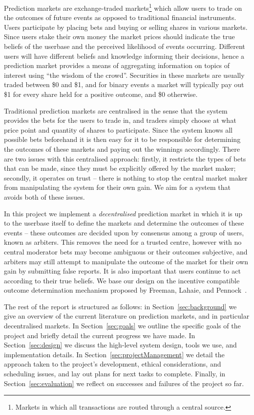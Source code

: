 \documentclass[10pt,a4paper]{article}
\theoremstyle{plain}
\theoremstyle{definition}
\begin{document}
Prediction markets are exchange-traded markets\footnote{Markets in which all
transactions are routed through a central source.} which allow users to trade
on the outcomes of future events as opposed to traditional financial
instruments. Users participate by placing bets and buying or selling shares in
various markets. Since users stake their own money the market prices should
indicate the true beliefs of the userbase and the perceived likelihood of
events occurring. Different users will have different beliefs and knowledge
informing their decisions, hence a prediction market provides a means of
aggregating information on topics of interest using ``the wisdom of the
crowd''. Securities in these markets are usually traded between \$0 and \$1,
and for binary events a market will typically pay out \$1 for every share held
for a positive outcome, and \$0 otherwise.

Traditional prediction markets are centralised in the sense that the system
provides the bets for the users to trade in, and traders simply choose at what
price point and quantity of shares to participate. Since the system knows all
possible bets beforehand it is then easy for it to be responsible for
determining the outcomes of these markets and paying out the winnings
accordingly. There are two issues with this centralised approach: firstly, it
restricts the types of bets that can be made, since they must be explicitly
offered by the market maker; secondly, it operates on trust -- there is nothing
to stop the central market maker from manipulating the system for their own
gain. We aim for a system that avoids both of these issues.

In this project we implement a \emph{decentralised} prediction market in which
it is up to the userbase itself to define the markets and determine the
outcomes of these events -- these outcomes are decided upon by consensus among
a group of users, known as arbiters. This removes the need for a trusted
centre, however with no central moderator bets may become ambiguous or their
outcomes subjective, and arbiters may still attempt to manipulate the outcome
of the market for their own gain by submitting false reports. It is also
important that users continue to act according to their true beliefs. We base
our design on the incentive compatible outcome determination mechanism proposed
by Freeman, Lahaie, and Pennock~\cite{CODiPM}.

The rest of the report is structured as follows: in
Section~\ref{sec:background} we give an overview of the current literature on
prediction markets, and in particular decentralised markets. In
Section~\ref{sec:goals} we outline the specific goals of the project and
briefly detail the current progress we have made. In Section~\ref{sec:design}
we discuss the high-level system design, tools we use, and implementation
details. In Section~\ref{sec:projectManagement} we detail the approach taken to
the project's development, ethical considerations, and scheduling issues, and
lay out plans for next tasks to complete. Finally, in
Section~\ref{sec:evaluation} we reflect on successes and failures of the
project so far.
\end{document}
